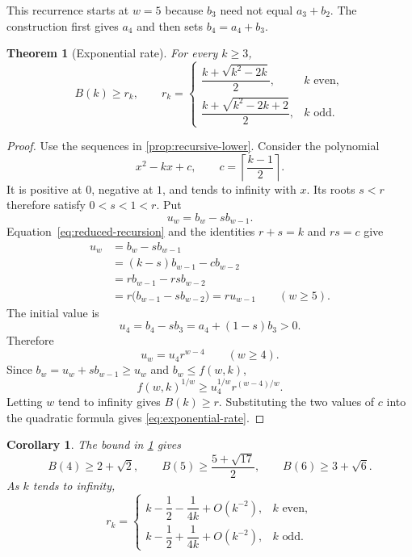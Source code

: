 \documentclass[11pt]{article}
\numberwithin{equation}{section}
\newtheorem{theorem}{Theorem}[section]
\newtheorem{corollary}[corollary]{Corollary}
\theoremstyle{definition}
\theoremstyle{remark}
\begin{document}
This recurrence starts at $w=5$ because $b_3$ need not equal $a_3+b_2$.
The construction first gives $a_4$ and then sets $b_4=a_4+b_3$.

\begin{theorem}[Exponential rate]
\label{thm:exponential-rate}
For every $k\ge3$,
\begin{equation}
 B(k)\ge r_k,
 \qquad
 r_k=
 \begin{cases}
 \dfrac{k+\sqrt{k^2-2k}}{2},&k\text{ even},\\[6pt]
 \dfrac{k+\sqrt{k^2-2k+2}}{2},&k\text{ odd}.
 \end{cases}
 \label{eq:exponential-rate}
\end{equation}
\end{theorem}

\begin{proof}
Use the sequences in \cref{prop:recursive-lower}. Consider the polynomial
\[
 x^2-kx+c,
 \qquad
 c=\left\lceil\frac{k-1}{2}\right\rceil.
\]
It is positive at $0$, negative at $1$, and tends to infinity with $x$.
Its roots $s<r$ therefore satisfy $0<s<1<r$. Put
\[
 u_w=b_w-sb_{w-1}.
\]
Equation~\eqref{eq:reduced-recursion} and the identities $r+s=k$ and $rs=c$
give
\begin{align*}
 u_w
 &=b_w-sb_{w-1}\\
 &=(k-s)b_{w-1}-c b_{w-2}\\
 &=r b_{w-1}-rs b_{w-2}\\
 &=r\bigl(b_{w-1}-s b_{w-2}\bigr)
  =r u_{w-1}
 \qquad(w\ge5).
\end{align*}
The initial value is
\[
 u_4=b_4-sb_3=a_4+(1-s)b_3>0.
\]
Therefore
\[
 u_w=u_4r^{w-4}
 \qquad(w\ge4).
\]
Since $b_w=u_w+sb_{w-1}\ge u_w$ and $b_w\le f(w,k)$,
\[
 f(w,k)^{1/w}\ge u_4^{1/w}r^{(w-4)/w}.
\]
Letting $w$ tend to infinity gives $B(k)\ge r$. Substituting the two values
of $c$ into the quadratic formula gives \cref{eq:exponential-rate}.
\end{proof}

\begin{corollary}
\label{cor:rate-values}
The bound in \cref{thm:exponential-rate} gives
\[
 B(4)\ge2+\sqrt2,
 \qquad
 B(5)\ge\frac{5+\sqrt{17}}2,
 \qquad
 B(6)\ge3+\sqrt6.
\]
As $k$ tends to infinity,
\begin{equation}
 r_k=
 \begin{cases}
 k-\dfrac12-\dfrac{1}{4k}+O(k^{-2}),&k\text{ even},\\[6pt]
 k-\dfrac12+\dfrac{1}{4k}+O(k^{-2}),&k\text{ odd}.
 \end{cases}
 \label{eq:rate-expansion}
\end{equation}
\end{corollary}
\end{document}
